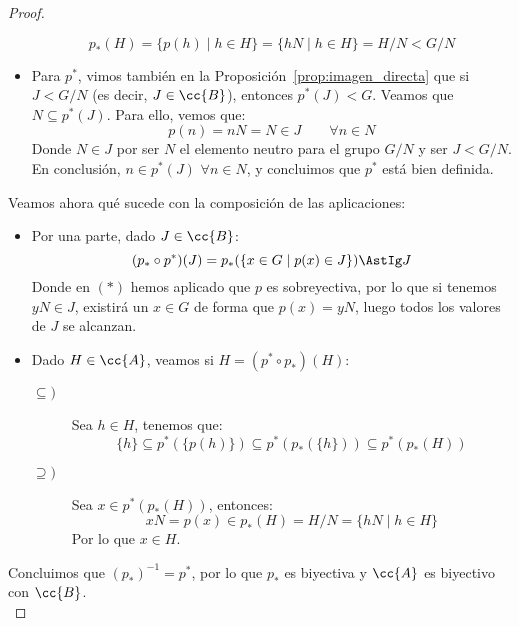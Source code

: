\begin{teo}
\begin{proof}
\begin{itemize}
                \begin{equation*}
                    p_\ast(H) = \{p(h) \mid h \in H\} = \{hN \mid h \in H\} = H/N < G/N
                \end{equation*}
            \item Para $p^\ast$, vimos también en la Proposición~\ref{prop:imagen_directa} que si $J<G/N$ (es decir, $J\in \cc{B}$), entonces $p^\ast(J)<G$. Veamos que $N\subseteq p^\ast(J)$. Para ello, vemos que:
                \begin{equation*}
                    p(n) = nN = N \in J \qquad \forall n\in N
                \end{equation*}
                Donde $N\in J$ por ser $N$ el elemento neutro para el grupo $G/N$ y ser $J < G/N$. En conclusión, $n\in p^\ast(J)$ $\forall n\in N$, y concluimos que $p^\ast$ está bien definida.
        \end{itemize}
        Veamos ahora qué sucede con la composición de las aplicaciones:
        \begin{itemize}
            \item Por una parte, dado $J\in \cc{B}$:
                \begin{equation*}
                    (p_\ast \circ p^\ast)(J) = p_\ast(\{x\in G\mid p(x) \in J\}) \AstIg J
                \end{equation*}
                Donde en $(\ast)$ hemos aplicado que $p$ es sobreyectiva, por lo que si tenemos $yN\in J$, existirá un $x\in G$ de forma que $p(x) = yN$, luego todos los valores de $J$ se alcanzan.
            \item Dado $H\in \cc{A}$, veamos si $H = (p^\ast \circ p_\ast)(H)$:
                \begin{description}
                    \item [$\subseteq)$] Sea $h\in H$, tenemos que:
                        \begin{equation*}
                            \{h\} \subseteq  p^\ast(\{p(h)\}) \subseteq  p^\ast(p_\ast(\{h\})) \subseteq p^\ast(p_\ast(H))
                        \end{equation*}
                    \item [$\supseteq)$] Sea $x\in p^\ast(p_\ast(H))$, entonces:
                        \begin{equation*}
                            xN = p(x) \in p_\ast(H) = H/N = \{hN \mid h\in H\}
                        \end{equation*}
                        Por lo que $x\in H$.
                \end{description}
        \end{itemize}
        Concluimos que ${(p_\ast)}^{-1} = p^\ast$, por lo que $p_\ast$ es biyectiva y $\cc{A}$ es biyectivo con $\cc{B}$.\\


\end{proof}
\end{teo}
